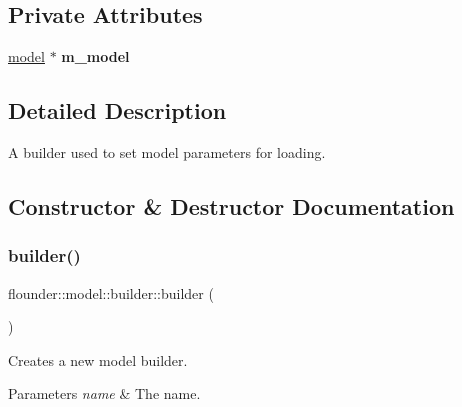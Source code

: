 \subsection*{Private Attributes}
\begin{DoxyCompactItemize}
\item 
\mbox{\label{classflounder_1_1model_1_1builder_a688d7323069bfcb5ac40714f822cfd26}} 
\hyperlink{classflounder_1_1model}{model} $\ast$ {\bfseries m\+\_\+model}
\end{DoxyCompactItemize}


\subsection{Detailed Description}
A builder used to set model parameters for loading. 



\subsection{Constructor \& Destructor Documentation}
\mbox{\label{classflounder_1_1model_1_1builder_a54b8e2555e3227af7b0228993f27d25d}} 
\subsubsection{\texorpdfstring{builder()}{builder()}}
{\footnotesize\ttfamily flounder\+::model\+::builder\+::builder (\begin{DoxyParamCaption}{ }\end{DoxyParamCaption})}



Creates a new model builder. 


\begin{DoxyParams}{Parameters}
{\em name} & The name. \\
\hline
\end{DoxyParams}
\mbox{\label{classflounder_1_1model_1_1builder_a638f3e963abefe6adf03f9b46651bb45}} 
